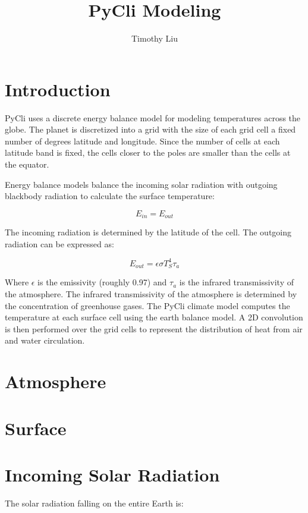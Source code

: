 \documentclass[12pt]{article} %
\title{PyCli Modeling}
\author{Timothy Liu}
\begin{document}
\maketitle

\tableofcontents

\newpage

\section{Introduction}
PyCli uses a discrete energy balance model for modeling temperatures across the globe. The planet is discretized into a grid with the size of each grid cell a fixed number of degrees latitude and longitude. Since the number of cells at each latitude band is fixed, the cells closer to the poles are smaller than the cells at the equator.

Energy balance models balance the incoming solar radiation with outgoing blackbody radiation to calculate the surface temperature:

$$E_{in} = E_{out}$$

The incoming radiation is determined by the latitude of the cell. The outgoing radiation can be expressed as:

$$E_{out} = \epsilon \sigma T_{S}^{4} \tau _{a}$$

Where $\epsilon$ is the emissivity (roughly 0.97) and $\tau _{a}$ is the infrared transmissivity of the atmosphere. The infrared transmissivity of the atmosphere is determined by the concentration of greenhouse gases. The PyCli climate model computes the temperature at each surface cell using the earth balance model. A 2D convolution is then performed over the grid cells to represent the distribution of heat from air and water circulation.

\section{Atmosphere}

\section{Surface}


\section{Incoming Solar Radiation}

The solar radiation falling on the entire Earth is:
\end{document}

